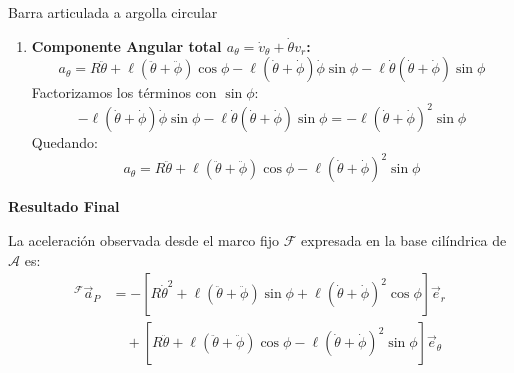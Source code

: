 \begin{solucion}{Barra articulada a argolla circular}
\begin{enumerate}
    \item \textbf{Componente Angular total $a_\theta = \dot{v}_\theta + \dot{\theta}v_r$:}
    \[
    a_\theta = R\ddot{\theta} + \ell(\ddot{\theta} + \ddot{\phi})\cos\phi - \ell(\dot{\theta} + \dot{\phi})\dot{\phi}\sin\phi - \ell\dot{\theta}(\dot{\theta} + \dot{\phi})\sin\phi
    \]
    Factorizamos los términos con $\sin\phi$:
    \[
    -\ell(\dot{\theta} + \dot{\phi})\dot{\phi}\sin\phi - \ell\dot{\theta}(\dot{\theta} + \dot{\phi})\sin\phi = -\ell(\dot{\theta} + \dot{\phi})^2\sin\phi
    \]
    Quedando:
    \[
    a_\theta = R\ddot{\theta} + \ell(\ddot{\theta} + \ddot{\phi})\cos\phi - \ell(\dot{\theta} + \dot{\phi})^2\sin\phi
    \]
\end{enumerate}

\vspace{0.5cm}

\noindent\textbf{Resultado Final}

La aceleración observada desde el marco fijo $\mathcal{F}$ expresada en la base cilíndrica de $\mathcal{A}$ es:
\[
\begin{aligned}
{}^{\mathcal{F}}\vec{a}_P &= -\left[ R\dot{\theta}^2 + \ell(\ddot{\theta} + \ddot{\phi})\sin\phi + \ell(\dot{\theta} + \dot{\phi})^2\cos\phi \right]\vec{e}_r \\
&\quad + \left[ R\ddot{\theta} + \ell(\ddot{\theta} + \ddot{\phi})\cos\phi - \ell(\dot{\theta} + \dot{\phi})^2\sin\phi \right]\vec{e}_\theta
\end{aligned}
\]
\end{solucion}


